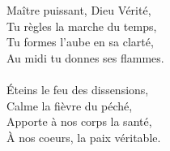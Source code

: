 Maître puissant, Dieu Vérité,\\
Tu règles la marche du temps,\\
Tu formes l’aube en sa clarté,\\
Au midi tu donnes ses flammes.\\
\\
Éteins le feu des dissensions,\\
Calme la fièvre du péché,\\
Apporte à nos corps la santé,\\
À nos coeurs, la paix véritable.